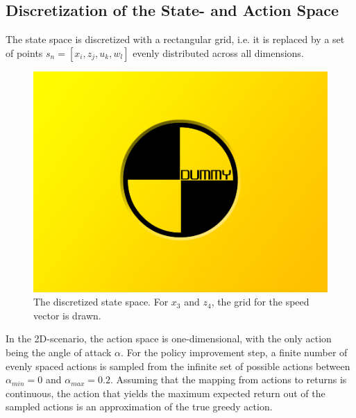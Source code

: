 \subsection{Discretization of the State- and Action Space}
\label{sec:disc2d}
The state space is discretized with a rectangular grid, i.e. it is replaced by a set of points $s_n=[x_i,z_j,u_k,w_l]$ evenly distributed across all dimensions.

\begin{figure}[h]
	\includegraphics[width=\textwidth]{src/pics/dummy.jpg}
	\caption{The discretized state space. For $x_3$ and $z_4$, the grid for the speed vector is drawn.}
	\label{fig:2d_state_space_discretized}
\end{figure}

In the 2D-scenario, the action space is one-dimensional, with the only action being the angle of attack $\alpha$. For the policy improvement step, a finite number of evenly spaced actions is sampled from the infinite set of possible actions between $\alpha_{min} = 0$ and $\alpha_{max}=0.2$. Assuming that the mapping from actions to returns is continuous, the action that yields the maximum expected return out of the sampled actions is an approximation of the true greedy action.

